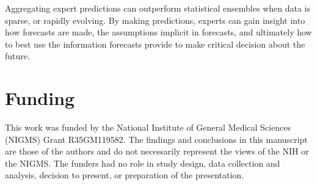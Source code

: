 \documentclass[preprint,authoryear]{elsarticle}
\begin{document}

Aggregating expert predictions can outperform statistical ensembles when data is sparse, or rapidly evolving.
By making predictions, experts can gain insight into how forecasts are made, the assumptions implicit in forecasts, and ultimately how to best use the information forecasts provide to make critical decision about the future.

\section{Funding}
This work was funded by the National Institute of General Medical Sciences (NIGMS) Grant R35GM119582. The findings and conclusions in this manuscript are those of the authors and do not necessarily represent the views of the NIH or the NIGMS. The funders had no role in study design, data collection and analysis, decision to present, or preparation of the presentation.



\section*{\refname}

\end{document}
